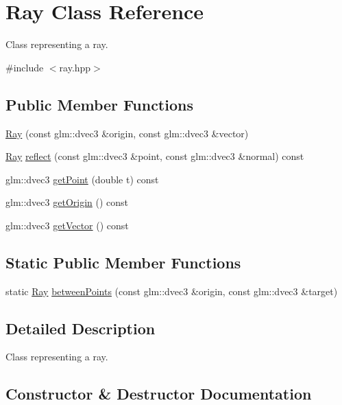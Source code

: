 \hypertarget{class_ray}{}\section{Ray Class Reference}
\label{class_ray}


Class representing a ray.  




{\ttfamily \#include $<$ray.\+hpp$>$}

\subsection*{Public Member Functions}
\begin{DoxyCompactItemize}
\item 
\hyperlink{class_ray_a42822fab0639a6169cafd890d6f34890}{Ray} (const glm\+::dvec3 \&origin, const glm\+::dvec3 \&vector)
\item 
\hyperlink{class_ray}{Ray} \hyperlink{class_ray_aef1b0930f0f36b5b8c36bd76047e3355}{reflect} (const glm\+::dvec3 \&point, const glm\+::dvec3 \&normal) const 
\item 
glm\+::dvec3 \hyperlink{class_ray_a916ce6b9eb52405079f3584415d2ee9e}{get\+Point} (double t) const 
\item 
glm\+::dvec3 \hyperlink{class_ray_a7b6409bd508dfbf670e848903a1ae2da}{get\+Origin} () const 
\item 
glm\+::dvec3 \hyperlink{class_ray_a9421f6429d2180c2370b5aca97499b41}{get\+Vector} () const 
\end{DoxyCompactItemize}
\subsection*{Static Public Member Functions}
\begin{DoxyCompactItemize}
\item 
static \hyperlink{class_ray}{Ray} \hyperlink{class_ray_a1c375b1e77118ea82af5668fb0f4b630}{between\+Points} (const glm\+::dvec3 \&origin, const glm\+::dvec3 \&target)
\end{DoxyCompactItemize}


\subsection{Detailed Description}
Class representing a ray. 

\subsection{Constructor \& Destructor Documentation}
